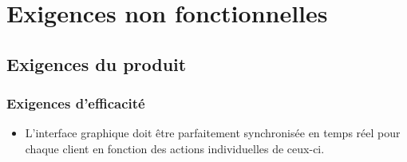 \section{Exigences non fonctionnelles}

\iffalse
\subsection{Product Requirements}
        \subsubsection{Efficiency Requirements}
            \begin{itemize}
            \renewcommand\labelitemi{\textbullet}
                \item No specific performance requirement has been given, such as an specific FPS (Frames Per Second) at which the program must run for example, but the main performance issue to overcome will be the proper synchronisation of images and animations in the graphical interface with what is actually happening real-time at each client machine connected to the server.
                \item In the same manner as the performance requirements, the program is designed for an specific platform with a high performance and hence space constraints are rather \textit{common sense}, in the sense that the size must be justified by the programs capabilities, as opposed to a delimited space that must be kept in mind throughout the project (such as is the case in mobile phone applications with a very limited memory).
            \end{itemize}
\fi
    \subsection{Exigences du produit}
    \subsubsection{Exigences d'efficacité}
        \begin{itemize}
        \renewcommand\labelitemi{\textbullet}
            \item L'interface graphique doit être parfaitement synchronisée en temps réel pour chaque client en fonction des actions individuelles de ceux-ci.
        \end{itemize}
\iffalse
        \subsubsection{Portability Requirements}
        The only requirement in terms of portability is its use across any machine in the \textbf{Salle PC} of the \textbf{PaDi}, otherwise know as the \textbf{Pa}rc \textbf{Di}dactique informatique de l'Universite Libre de Bruxelles
\fi

